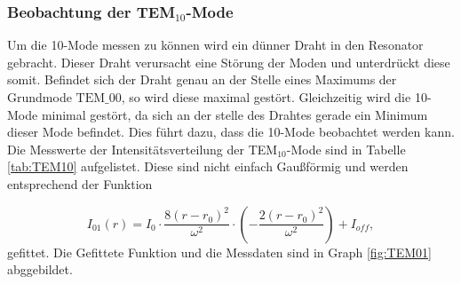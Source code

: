 \subsubsection{Beobachtung der TEM$_{10}$-Mode}
\label{sec:Beobachtung der EINFÜGEN-Mode}
Um die 10-Mode messen zu können wird ein dünner Draht in den Resonator gebracht.
Dieser Draht verursacht eine Störung der Moden und unterdrückt diese somit. Befindet sich der Draht genau an der Stelle eines Maximums der Grundmode $\text{TEM_{00}}$, so wird diese maximal gestört.
Gleichzeitig wird die 10-Mode minimal gestört, da sich an der stelle des Drahtes gerade ein Minimum dieser Mode befindet. Dies führt dazu, dass die 10-Mode beobachtet werden kann.
Die Messwerte der Intensitätsverteilung der TEM$_{10}$-Mode sind in Tabelle \ref{tab:TEM10} aufgelistet. Diese sind nicht einfach Gaußförmig und werden entsprechend der Funktion

\begin{equation}
  I_01(r) = I_0 \cdot \frac{8 (r - r_0)^2}{\omega^2} \cdot \left( - \frac{2 (r - r_0)^2}{\omega^2}\right) + I_{off},
\end{equation}
gefittet. Die Gefittete Funktion und die Messdaten sind in Graph \ref{fig:TEM01} abggebildet.


